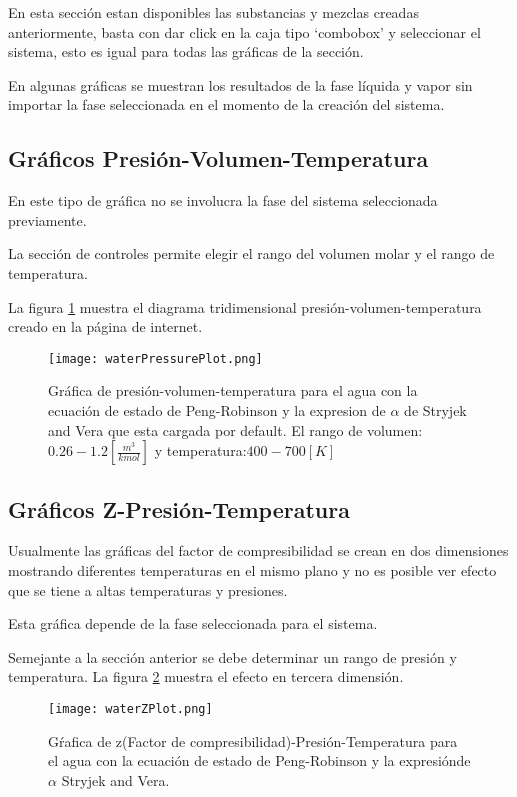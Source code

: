 	En esta sección estan disponibles las substancias y mezclas creadas anteriormente, basta con dar click en la caja tipo `combobox' y seleccionar el sistema, esto es igual para todas las gráficas de la sección.

	En algunas gráficas se muestran los resultados de la fase líquida y vapor sin importar la fase seleccionada en el momento de la creación del sistema.

	\subsection{Gráficos Presión-Volumen-Temperatura}\label{subsec:pvt}
		En este tipo de gráfica no se involucra la fase del sistema seleccionada previamente. 

		La sección de controles permite elegir el rango del volumen molar y el rango de temperatura.
		
		La figura \ref{fig:press} muestra el diagrama tridimensional presión-volumen-temperatura creado en la página de internet.
		\begin{figure}[H]
			\texttt{[image: waterPressurePlot.png]}
			\caption{Gráfica de presión-volumen-temperatura para el agua con la ecuación de estado de Peng-Robinson y la expresion de $\alpha$ de Stryjek and Vera que esta cargada por default. El rango de volumen: $0.26-1.2 [\frac{m^3}{kmol}]$ y temperatura:$400-700[K]$ }
			\label{fig:press}
		\end{figure}
	\subsection{Gráficos Z-Presión-Temperatura}\label{subsec:zpt}
		Usualmente las gráficas del factor de compresibilidad se crean en dos dimensiones mostrando diferentes temperaturas en el mismo plano y no es posible ver efecto que se tiene a altas temperaturas y presiones.

		Esta gráfica depende de la fase seleccionada para el sistema.

		Semejante a la sección anterior se debe determinar un rango de presión y temperatura. La figura \ref{fig:zplot} muestra el efecto en tercera dimensión.
		\begin{figure}[H]
			\texttt{[image: waterZPlot.png]}
			\caption{Gŕafica de z(Factor de compresibilidad)-Presión-Temperatura para el agua con la ecuación de estado de Peng-Robinson y la expresiónde $\alpha$ Stryjek and Vera.}
			\label{fig:zplot}
		\end{figure}
